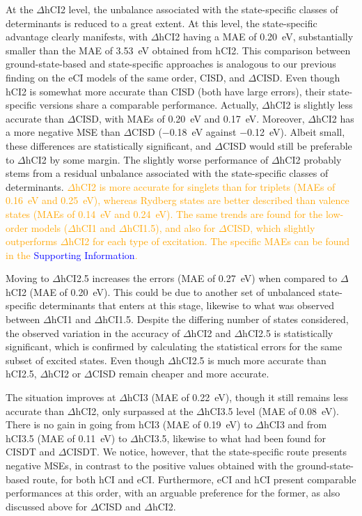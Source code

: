 \documentclass[aip,jcp,reprint,noshowkeys,superscriptaddress]{revtex4-1}
\newcommand{\fk}[1]{\textcolor{orange}{#1}}
\newcommand{\SupInf}{\textcolor{blue}{Supporting Information}}
\begin{document}
At the $\Delta$hCI2 level, the unbalance associated with the state-specific classes of determinants is reduced to a great extent.
At this level, the state-specific advantage clearly manifests, with $\Delta$hCI2 having a MAE of \SI{0.20}{\eV}, substantially smaller than the MAE of \SI{3.53}{\eV} obtained from hCI2.
This comparison between ground-state-based and state-specific approaches is analogous to our previous finding on the eCI models of the same order, CISD, and $\Delta$CISD. \cite{Kossoski_2023}
Even though hCI2 is somewhat more accurate than CISD (both have large errors), their state-specific versions share a comparable performance.
Actually, $\Delta$hCI2 is slightly less accurate than $\Delta$CISD, with MAEs of \SI{0.20}{\eV} and \SI{0.17}{\eV}.
Moreover, $\Delta$hCI2 has a more negative MSE than $\Delta$CISD (\SI{-0.18}{\eV} against \SI{-0.12}{\eV}).
Albeit small, these differences are statistically significant, and $\Delta$CISD would still be preferable to $\Delta$hCI2 by some margin.
The slightly worse performance of $\Delta$hCI2 probably stems from a residual unbalance associated with the state-specific classes of determinants.
\fk{$\Delta$hCI2 is more accurate for singlets than for triplets (MAEs of \SI{0.16}{\eV} and \SI{0.25}{\eV}), 
whereas Rydberg states are better described than valence states (MAEs of \SI{0.14}{\eV} and \SI{0.24}{\eV}).
The same trends are found for the low-order models ($\Delta$hCI1 and $\Delta$hCI1.5), and also for $\Delta$CISD, which slightly outperforms $\Delta$hCI2 for each type of excitation.
The specific MAEs can be found in the {\SupInf}.}

Moving to $\Delta$hCI2.5 increases the errors (MAE of \SI{0.27}{\eV}) when compared to $\Delta$hCI2 (MAE of \SI{0.20}{\eV}).
This could be due to another set of unbalanced state-specific determinants that enters at this stage, likewise to what was observed between $\Delta$hCI1 and $\Delta$hCI1.5.
Despite the differing number of states considered, the observed variation in the accuracy of $\Delta$hCI2 and $\Delta$hCI2.5 is statistically significant,
which is confirmed by calculating the statistical errors for the same subset of excited states.
Even though $\Delta$hCI2.5 is much more accurate than hCI2.5, $\Delta$hCI2 or $\Delta$CISD remain cheaper and more accurate.

The situation improves at $\Delta$hCI3 (MAE of \SI{0.22}{\eV}), though it still remains less accurate than $\Delta$hCI2,
only surpassed at the $\Delta$hCI3.5 level (MAE of \SI{0.08}{\eV}).
There is no gain in going from hCI3 (MAE of \SI{0.19}{\eV}) to $\Delta$hCI3 and from hCI3.5 (MAE of \SI{0.11}{\eV}) to $\Delta$hCI3.5,
likewise to what had been found for CISDT and $\Delta$CISDT. \cite{Kossoski_2023}
We notice, however, that the state-specific route presents negative MSEs, in contrast to the positive values obtained with the ground-state-based route, for both hCI and eCI.
Furthermore, eCI and hCI present comparable performances at this order, with an arguable preference for the former,
as also discussed above for $\Delta$CISD and $\Delta$hCI2.
\end{document}
